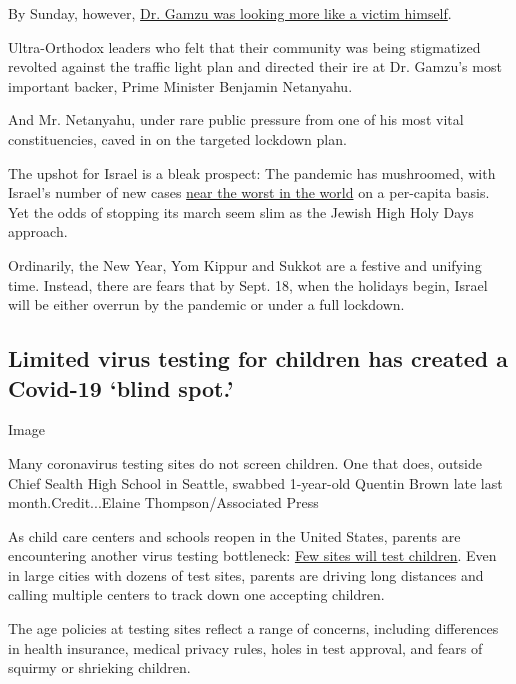 By Sunday, however,
\href{https://www.nytimes3xbfgragh.onion/2020/09/08/world/middleeast/israel-coronavirus-ronni-gamzu-netanyahu.html}{Dr.
Gamzu was looking more like a victim himself}.

Ultra-Orthodox leaders who felt that their community was being
stigmatized revolted against the traffic light plan and directed their
ire at Dr. Gamzu's most important backer, Prime Minister Benjamin
Netanyahu.

And Mr. Netanyahu, under rare public pressure from one of his most vital
constituencies, caved in on the targeted lockdown plan.

The upshot for Israel is a bleak prospect: The pandemic has mushroomed,
with Israel's number of new cases
\href{https://www.nytimes3xbfgragh.onion/interactive/2020/world/coronavirus-maps.html\#countries}{near
the worst in the world} on a per-capita basis. Yet the odds of stopping
its march seem slim as the Jewish High Holy Days approach.

Ordinarily, the New Year, Yom Kippur and Sukkot are a festive and
unifying time. Instead, there are fears that by Sept. 18, when the
holidays begin, Israel will be either overrun by the pandemic or under a
full lockdown.

\hypertarget{limited-virus-testing-for-children-has-created-a-covid-19-blind-spot}{%
\subsection{Limited virus testing for children has created a Covid-19
`blind
spot.'}\label{limited-virus-testing-for-children-has-created-a-covid-19-blind-spot}}

Image

Many coronavirus testing sites do not screen children. One that does,
outside Chief Sealth High School in Seattle, swabbed 1-year-old Quentin
Brown late last month.Credit...Elaine Thompson/Associated Press

As child care centers and schools reopen in the United States, parents
are encountering another virus testing bottleneck:
\href{https://www.nytimes3xbfgragh.onion/2020/09/08/upshot/children-testing-shortfalls-virus.html}{Few
sites will test children}. Even in large cities with dozens of test
sites, parents are driving long distances and calling multiple centers
to track down one accepting children.

The age policies at testing sites reflect a range of concerns, including
differences in health insurance, medical privacy rules, holes in test
approval, and fears of squirmy or shrieking children.

